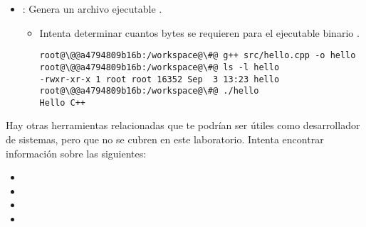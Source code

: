 \begin{itemize}
  \item {}:
        Genera un archivo ejecutable .
    \begin{itemize}
      \item Intenta determinar cuantos bytes se requieren para el 
            ejecutable binario .
\begin{lstlisting}[style=terminal,escapechar=@]
root@\@@a4794809b16b:/workspace@\#@ g++ src/hello.cpp -o hello
root@\@@a4794809b16b:/workspace@\#@ ls -l hello
-rwxr-xr-x 1 root root 16352 Sep  3 13:23 hello
root@\@@a4794809b16b:/workspace@\#@ ./hello
Hello C++
\end{lstlisting}
    \end{itemize}
\end{itemize}

Hay otras herramientas relacionadas que te podrían ser útiles como desarrollador de sistemas, pero que no se cubren en este laboratorio.
Intenta encontrar información sobre las siguientes:

\begin{itemize}
  \item {}
  \item {}
  \item {}
  \item {}
\end{itemize}

